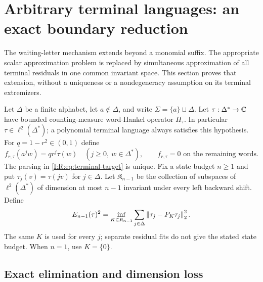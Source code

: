 


\section{Arbitrary terminal languages: an exact boundary reduction}
\label{I:R:sec:terminal-languages}

The waiting-letter mechanism extends beyond a monomial suffix.  The
appropriate scalar approximation problem is replaced by simultaneous
approximation of all terminal residuals in one common invariant space.
This section proves that extension, without a uniqueness or a
nondegeneracy assumption on its terminal extremizers.

Let $\Delta$ be a finite alphabet, let $a\notin\Delta$, and write
$\Sigma=\{a\}\sqcup\Delta$.  Let
$\tau:\Delta^*\to\mathbb C$ have bounded counting-measure word-Hankel operator
$H_\tau$.  In particular $\tau\in\ell^2(\Delta^*)$; a polynomial
terminal language always satisfies this hypothesis.  For
$q=1-r^2\in(0,1)$ define
\begin{equation}
 f_{r,\tau}(a^j w)=qr^j\tau(w)
 \quad(j\ge0,\ w\in\Delta^*),
 \qquad f_{r,\tau}=0\text{ on the remaining words}.
 \label{I:R:eq:terminal-target}
\end{equation}
The parsing in \eqref{I:R:eq:terminal-target} is unique.  Fix a state budget
$n\ge1$ and put $\tau_j(v)=\tau(jv)$ for $j\in\Delta$.
Let $\mathfrak K_{n-1}$ be the collection of subspaces of
$\ell^2(\Delta^*)$ of dimension at most $n-1$ invariant under every
left backward shift.  Define
\begin{equation}
 E_{n-1}(\tau)^2=
 \inf_{K\in\mathfrak K_{n-1}}
       \sum_{j\in\Delta}\left\lVert\tau_j-P_K\tau_j\right\rVert_2^2.
 \label{I:R:eq:terminal-E}
\end{equation}
The same $K$ is used for every $j$; separate residual fits do not give
the stated state budget.  When $n=1$, use $K=\{0\}$.

\subsection{Exact elimination and dimension loss}

